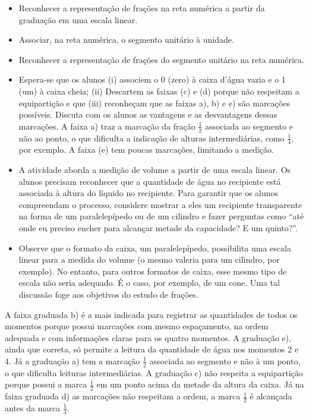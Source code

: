 \begin{atividade}\label{chap3-ativ1}
\objetivos
\begin{itemize} %
    \item Reconhecer a representação de frações na reta numérica a partir da graduação em uma escala linear.
    \item Associar,  na reta numérica, o segmento unitário à unidade.
    \item Reconhecer a representação de frações do segmento unitário na reta numérica.
\end{itemize} %

\discussoes
\begin{itemize} %
\item Espera-se que os alunos (i) associem o 0 (zero) à caixa d'água vazia e o 1 (um) à caixa cheia; (ii) Descartem as faixas (c) e (d) porque não respeitam a equipartição e que (iii) reconheçam que as faixas a), b) e e) são marcações possíveis. Discuta com os alunos as vantagens e as desvantagens dessas marcações. A faixa a) traz a marcação da fração $\frac{1}{2}$ associada ao segmento e não ao ponto, o que dificulta a indicação de alturas intermediárias, como $\frac{1}{4}$, por exemplo. A faixa (e) tem poucas marcações, limitando a medição.
\item A atividade aborda a medição de volume a partir de uma escala linear. Os alunos precisam reconhecer que a quantidade de água no recipiente está associada à altura do líquido no recipiente. Para garantir que os alunos compreendam o processo, considere mostrar a eles um recipiente transparente na forma de um paralelepípedo ou de um cilindro e fazer perguntas como ``até onde eu preciso encher para alcançar metade da capacidade? E um quinto?''.
\item Observe que o formato da caixa, um paralelepípedo, possibilita uma escala linear para a medida do volume (o mesmo valeria para um cilindro, por exemplo). No entanto, para outros formatos de caixa, esse mesmo tipo de escala não seria adequado. É o caso, por exemplo, de um cone. Uma tal discussão foge aos objetivos do estudo de frações.
\end{itemize} %

\solucao
  A faixa graduada b) é a mais indicada para registrar as quantidades de todos os momentos porque possui marcações com mesmo espaçamento, na ordem adequada e com informações claras para os quatro momentos. A graduação e), ainda que correta, só permite a leitura da quantidade de água nos momentos 2 e 4. Já a graduação a) tem a marcação $\frac{1}{2}$ associada ao segmento e não à um ponto, o que dificulta leituras intermediárias. A graduação c) não respeita a equipartição porque possui a marca $\frac{1}{2}$ em um ponto acima da metade da altura da caixa. Já na faixa graduada d) as marcações não respeitam a ordem, a marca $\frac{1}{2}$ é alcançada antes da marca $\frac{1}{3}$. 

\end{atividade}

